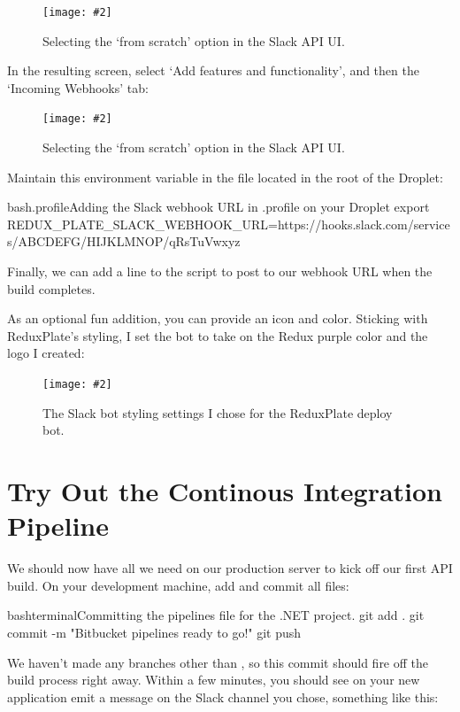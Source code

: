 \documentclass[a4paper,headinclude=on,footinclude=on,12pt,oneside]{scrbook}
\newcommand{\standardfigure}[3]{\begin{figure}[H]\begin{center}\texttt{[image: \#2]}\caption{#3}\label{fig:#2}\end{center}\end{figure}}
\begin{document}
\standardfigure{\textwidth}{/backend/slack/application-values}{Selecting the `from scratch' option in the Slack API UI.}

In the resulting screen, select `Add features and functionality', and then the `Incoming Webhooks' tab:

\standardfigure{\textwidth}{/backend/slack/application-values}{Selecting the `from scratch' option in the Slack API UI.}

Maintain this environment variable in the  file located in the root of the Droplet:

\begin{codeInput}{bash}{.profile}{Adding the Slack webhook URL in .profile on your Droplet}
export REDUX_PLATE_SLACK_WEBHOOK_URL=https://hooks.slack.com/services/ABCDEFG/HIJKLMNOP/qRsTuVwxyz
\end{codeInput}

Finally, we can add a  line to the  script to post to our webhook URL when the build completes.



As an optional fun addition, you can provide an icon and color. Sticking with ReduxPlate's styling, I set the bot to take on the Redux purple color and the logo I created:

\standardfigure{\textwidth}{backend/slack/styling-deploy-bot}{The Slack bot styling settings I chose for the ReduxPlate deploy bot.}

\section{Try Out the Continous Integration Pipeline}

We should now have all we need on our production server to kick off our first API build. On your development machine, add and commit all files:

\begin{codeInput}{bash}{terminal}{Committing the pipelines file for the .NET project.}
git add .
git commit -m "Bitbucket pipelines ready to go!"
git push
\end{codeInput}

We haven't made any branches other than , so this commit should fire off the build process right away. Within a few minutes, you should see on your new application emit a message on the Slack channel you chose, something like this:
\end{document}
